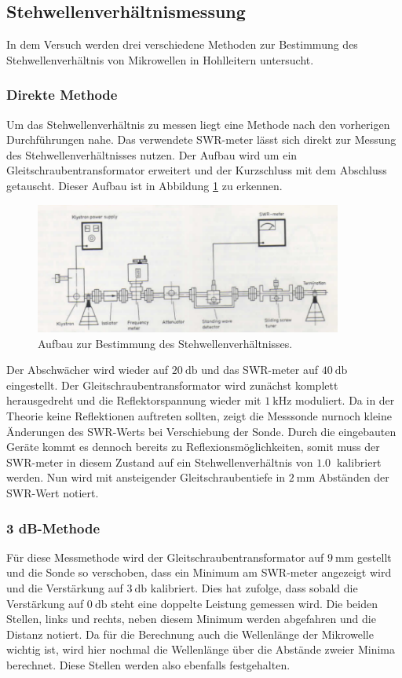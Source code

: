 \subsection{Stehwellenverhältnismessung}
In dem Versuch werden drei verschiedene Methoden zur Bestimmung des Stehwellenverhältnis von Mikrowellen in Hohlleitern untersucht.

\subsubsection{Direkte Methode}
Um das Stehwellenverhältnis zu messen liegt eine Methode nach den vorherigen Durchführungen nahe. Das verwendete SWR-meter lässt sich direkt zur Messung des Stehwellenverhältnisses nutzen. Der Aufbau wird um ein Gleitschraubentransformator erweitert
und der Kurzschluss mit dem Abschluss getauscht. Dieser Aufbau ist in Abbildung \ref{fig:3} zu erkennen. 

\begin{figure}
    \centering
    \includegraphics[width=0.9\textwidth]{bilder/aufbau3.png}
    \caption{Aufbau zur Bestimmung des Stehwellenverhältnisses. \cite{skript}} 
    \label{fig:3}
\end{figure}
Der Abschwächer wird wieder auf $\SI{20}{\decibel}$ und das SWR-meter auf $\SI{40}{\decibel}$ eingestellt. Der Gleitschraubentransformator wird zunächst komplett herausgedreht und die Reflektorspannung wieder mit $\SI{1}{\kilo\hertz}$ moduliert.
Da in der Theorie keine Reflektionen auftreten sollten, zeigt die Messsonde nurnoch kleine Änderungen des SWR-Werts bei Verschiebung der Sonde. Durch die eingebauten Geräte kommt es dennoch bereits zu Reflexionsmöglichkeiten, somit muss 
der SWR-meter in diesem Zustand auf ein Stehwellenverhältnis von $\SI{1.0}{}$ kalibriert werden. Nun wird mit ansteigender Gleitschraubentiefe in $\SI{2}{\milli\meter}$ Abständen der SWR-Wert notiert.

\subsubsection{3 dB-Methode}
Für diese Messmethode wird der Gleitschraubentransformator auf $\SI{9}{\milli\meter}$ gestellt und die Sonde so verschoben, dass ein Minimum am SWR-meter angezeigt wird und die Verstärkung auf $\SI{3}{\decibel}$ kalibriert.  Dies hat zufolge, dass 
sobald die Verstärkung auf $\SI{0}{\decibel}$ steht eine doppelte Leistung gemessen wird. Die beiden Stellen, links und rechts, neben diesem Minimum werden abgefahren und die Distanz notiert. Da für die Berechnung auch die
Wellenlänge der Mikrowelle wichtig ist, wird hier nochmal die Wellenlänge über die Abstände zweier Minima berechnet. Diese Stellen werden also ebenfalls festgehalten.

